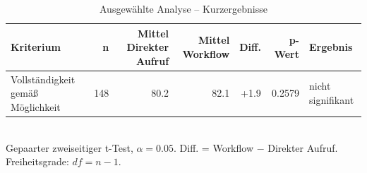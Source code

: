 \begin{table}[htbp]
\centering
\caption{Ausgewählte Analyse -- Kurzergebnisse}
\begin{tabular}{lrrrrrl}
\toprule
Kriterium & n & Mittel Direkter Aufruf & Mittel Workflow & Diff. & p-Wert & Ergebnis \\
\midrule
Vollständigkeit gemäß Möglichkeit & 148 & 80.2 & 82.1 & +1.9 & 0.2579 & nicht signifikant \\
\bottomrule
\end{tabular}
\\[2mm]
\footnotesize Gepaarter zweiseitiger t-Test, $\alpha=0.05$. Diff. = Workflow $-$ Direkter Aufruf. Freiheitsgrade: $df=n-1$.
\end{table}

